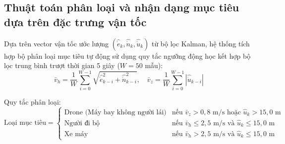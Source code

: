 \subsection{Thuật toán phân loại và nhận dạng mục tiêu dựa trên đặc trưng vận tốc}

\hspace{0.5cm} Dựa trên vector vận tốc ước lượng $(\hat{\dot{e}}_k, \hat{\dot{n}}_k, \hat{\dot{u}}_k)$ từ bộ lọc Kalman, hệ thống tích hợp bộ phân loại mục tiêu tự động sử dụng quy tắc ngưỡng động học kết hợp bộ lọc trung bình trượt thời gian 5 giây ($W = 50$ mẫu):
\begin{equation}
\bar{v}_h = \frac{1}{W}\sum_{i=0}^{W-1} \sqrt{\hat{\dot{e}}_{k-i}^2 + \hat{\dot{n}}_{k-i}^2}, \quad \bar{v}_z = \frac{1}{W}\sum_{i=0}^{W-1} |\hat{\dot{u}}_{k-i}|
\label{eq:average-velocity-features}
\end{equation}

Quy tắc phân loại:
\begin{equation}
\text{Loại mục tiêu} = \begin{cases}
\text{Drone (Máy bay không người lái)} & \text{nếu } \bar{v}_z > 0{,}8\text{ m/s} \text{ hoặc } \hat{u}_k > 15{,}0\text{ m} \\
\text{Người đi bộ} & \text{nếu } \bar{v}_h \le 2{,}5\text{ m/s} \text{ và } \hat{u}_k \le 15{,}0\text{ m} \\
\text{Xe máy} & \text{nếu } \bar{v}_h > 2{,}5\text{ m/s} \text{ và } \hat{u}_k \le 15{,}0\text{ m}
\end{cases}
\label{eq:target-classification-rule}
\end{equation}

\begin{table}[H]
\centering
\caption{Ma trận nhầm lẫn (Confusion Matrix) phân loại mục tiêu trên 300 kịch bản thử nghiệm}
\label{tab:target-classification-confusion-matrix}
\end{table}

